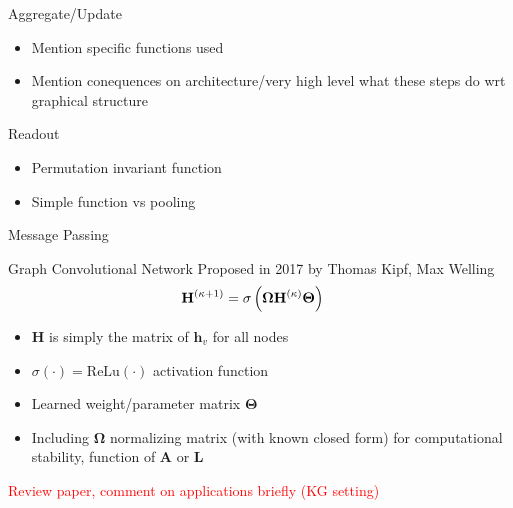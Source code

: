 \documentclass{beamer}
\newcommand{\node}{v}
\newcommand{\edge}{e}
\newcommand{\iter}{\kappa}
\newcommand{\AdjMat}{\mathbf{A}}
\newcommand{\LapMat}{\mathbf{L}}
\begin{document}
\begin{frame}{Aggregate/Update}
    \begin{itemize}
        \color{red}
        \item Mention specific functions used 
        \item Mention conequences on architecture/very high level what these steps do wrt graphical structure  
    \end{itemize}
\end{frame}

\begin{frame}{Readout}
    \begin{itemize}
        \color{red}
        \item Permutation invariant function 
        \item Simple function vs pooling
    \end{itemize}
\end{frame}


\begin{frame}{Message Passing}
\end{frame}

\begin{frame}{Graph Convolutional Network}
    Proposed in 2017 by Thomas Kipf, Max Welling \cite{kipf_semi-supervised_2017}
        \begin{align*}
        \iffalse
            \mathbf{h}_\node^{(\iter+1)} 
            &=
            \text{Update}
            \left( 
            x_\node^{(\iter)}
            ,   
            \text{Aggregate}
            (
                h_\node^{(\iter)}, x_u^{(\iter)}, \edge_{u,\node}^{(\iter)}
            )
            \right)
        \\
        \fi 
            \mathbf{H}^{(\iter+1)} 
            &=
            \sigma
            \left( 
                \mathbf{
                \Omega 
                H^{(\iter)}
                \Theta 
                }            
            \right)
    \end{align*}
    
    \begin{itemize}
        \item $\mathbf{H}$ is simply the matrix of $\mathbf{h}_\node$ for all nodes 
        \item $\sigma(\cdot) = \text{ReLu}(\cdot)$ activation function
        \item Learned weight/parameter matrix $\boldsymbol\Theta$
        \item Including $\boldsymbol\Omega$ normalizing matrix (with known closed form) for computational stability, function of $\AdjMat$ or $\LapMat$
    \end{itemize}
    \textcolor{red}{Review paper, comment on applications briefly (KG setting)}
    \end{frame}
\end{document}
